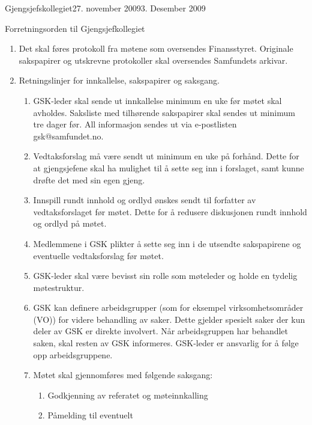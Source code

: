 \begin{instruks}{Gjengsjefskollegiet}{27. november 2009}{3. Desember 2009}
\begin{instruksledd}{Forretningsorden til Gjengsjefkollegiet}
\begin{enumerate}
            \item Det skal føres protokoll fra møtene som oversendes Finansstyret. Originale
                sakspapirer og utskrevne
                protokoller skal oversendes Samfundets arkivar.
            \item Retningslinjer for innkallelse, sakspapirer og saksgang.
                \begin{enumerate}
                    \item GSK-leder skal sende ut innkallelse minimum en uke før møtet skal
                        avholdes. Saksliste med tilhørende
                        sakspapirer skal sendes ut minimum tre dager før. All informasjon sendes
                        ut via e-postlisten gsk@samfundet.no.
                    \item Vedtaksforslag må være sendt ut minimum en uke på forhånd. Dette for at
                        gjengsjefene skal ha mulighet
                        til å sette seg inn i forslaget, samt kunne drøfte det med sin egen gjeng.
                    \item Innspill rundt innhold og ordlyd
                        ønskes sendt til forfatter av vedtaksforslaget før møtet. Dette for å
                        redusere diskusjonen rundt innhold og
                        ordlyd på møtet.
                    \item Medlemmene i GSK plikter å sette seg inn i de utsendte sakspapirene og
                        eventuelle vedtaksforslag før
                        møtet.
                    \item GSK-leder skal være bevisst sin rolle som møteleder og holde en tydelig
                        møtestruktur.
                    \item GSK kan definere arbeidsgrupper (som for eksempel virksomhetsområder (VO))
                        for videre behandling
                        av saker. Dette gjelder spesielt saker der kun deler av GSK er direkte
                        involvert. Når arbeidsgruppen har
                        behandlet saken, skal resten av GSK informeres. GSK-leder er ansvarlig for
                        å følge opp
                        arbeidsgruppene.
                    \item Møtet skal gjennomføres med følgende saksgang:
                        \begin{enumerate}
                            \item Godkjenning av referatet og møteinnkalling
                            \item Påmelding til eventuelt

\end{enumerate}
\end{enumerate}
\end{enumerate}
\end{instruksledd}
\end{instruks}
